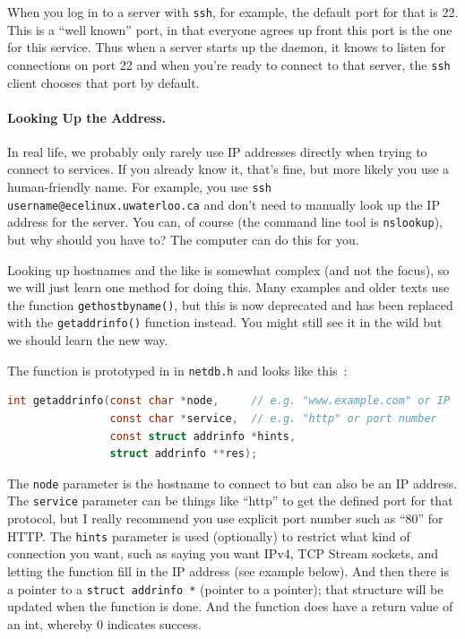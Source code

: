 \documentclass[a4paper]{report}
\begin{document}
When you log in to a server with \texttt{ssh}, for example, the default port for that is 22. This is a ``well known'' port, in that everyone agrees up front this port is the one for this service. Thus when a server starts up the daemon, it knows to listen for connections on port 22 and when you're ready to connect to that server, the \texttt{ssh} client chooses that port by default.

\paragraph{Looking Up the Address.}
In real life, we probably only rarely use IP addresses directly when trying to connect to services. If you already know it, that's fine, but more likely you use a human-friendly name. For example, you use \texttt{ssh username@ecelinux.uwaterloo.ca} and don't need to manually look up the IP address for the server. You can, of course (the command line tool is \texttt{nslookup}), but why should you have to? The computer can do this for you.

Looking up hostnames and the like is somewhat complex (and not the focus), so we will just learn one method for doing this. Many examples and older texts use the function \texttt{gethostbyname()}, but this is now deprecated and has been replaced with the \texttt{getaddrinfo()} function instead. You might still see it in the wild but we should learn the new way.

The function is prototyped in in \texttt{netdb.h} and looks like this~\cite{getaddrinfo}:
\begin{lstlisting}[language=C]
int getaddrinfo(const char *node,     // e.g. "www.example.com" or IP
                const char *service,  // e.g. "http" or port number
                const struct addrinfo *hints,
                struct addrinfo **res);
\end{lstlisting}

The \texttt{node} parameter is the hostname to connect to but can also be an IP address. The \texttt{service} parameter can be things like ``http'' to get the defined port for that protocol, but I really recommend you use explicit port number such as ``80'' for HTTP. The \texttt{hints} parameter is used (optionally) to restrict what kind of connection you want, such as saying you want IPv4, TCP Stream sockets, and letting the function fill in the IP address (see example below). And then there is a pointer to a \texttt{struct addrinfo *} (pointer to a pointer); that structure will be updated when the function is done. And the function does have a return value of an int, whereby 0 indicates success.
\end{document}
